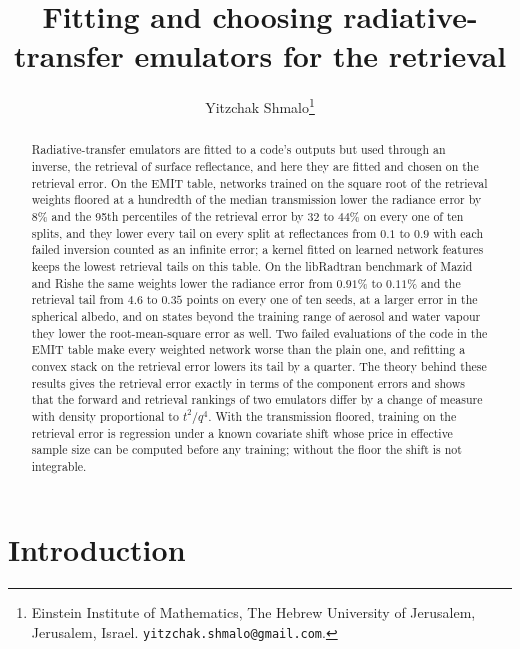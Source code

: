 \documentclass[11pt]{article}
\title{Fitting and choosing radiative-transfer emulators for the retrieval}
\author{Yitzchak Shmalo\thanks{Einstein Institute of Mathematics, The Hebrew University of Jerusalem, Jerusalem,
Israel. \texttt{yitzchak.shmalo@gmail.com}.}}
\date{}
\theoremstyle{remark}
\newcommand{\1}{\mathbf{1}}
\begin{document}
\maketitle

\begin{abstract}
Radiative-transfer emulators are fitted to a code's outputs but used through an inverse, the retrieval of surface
reflectance, and here they are fitted and chosen on the retrieval error. On the EMIT table, networks trained on the
square root of the retrieval weights floored at a hundredth of the median transmission lower the radiance error by
$8\%$ and the 95th percentiles of the retrieval error by $32$ to $44\%$ on every one of ten splits, and they lower
every tail on every split at reflectances from $0.1$ to $0.9$ with each failed inversion counted as an infinite error;
a kernel fitted on learned network features keeps the lowest retrieval tails on this table. On the libRadtran
benchmark of Mazid and Rishe the same weights lower the radiance error from $0.91\%$ to $0.11\%$ and the retrieval tail
from $4.6$ to $0.35$ points on every one of ten seeds, at a larger error in the spherical albedo, and on states beyond
the training range of aerosol and water vapour they lower the root-mean-square error as well. Two failed evaluations of
the code in the EMIT table make every weighted network worse than the plain one, and refitting a convex stack on the
retrieval error lowers its tail by a quarter. The theory behind these results gives the retrieval error exactly in
terms of the component errors and shows that the forward and retrieval rankings of two emulators differ by a change of
measure with density proportional to $t^2/q^4$. With the transmission floored, training on the retrieval error is
regression under a known covariate shift whose price in effective sample size can be computed before any training;
without the floor the shift is not integrable.
\end{abstract}

\section{Introduction}
\end{document}
